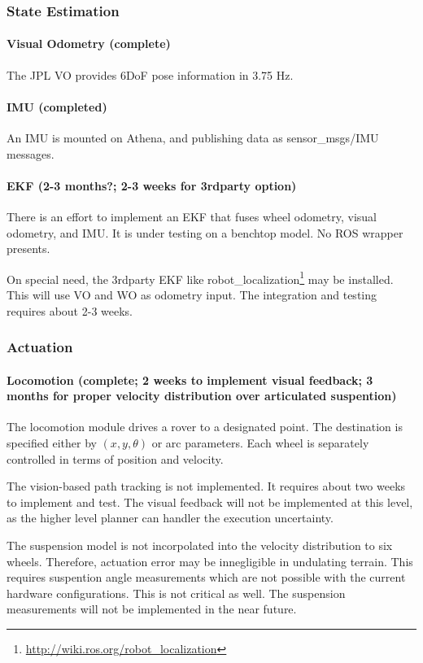 \documentclass[conference]{IEEEtran}
\newcommand{\kyon}[1]{{\color{cyan} #1}}
\newcommand{\done}[1]{{\color{gray} #1}}
\begin{document}
\subsubsection{State Estimation}

\paragraph{Visual Odometry (complete)}
\done{
The JPL VO provides 6DoF pose information in 3.75 Hz. 
}

\paragraph{IMU (completed)}
\done{
An IMU is mounted on Athena, and publishing data as sensor\_msgs/IMU messages.
}

\paragraph{EKF (2-3 months?; 2-3 weeks for 3rdparty option)}
There is an effort to implement an EKF that fuses wheel odometry, visual odometry, and IMU. It is under testing on a benchtop model. No ROS wrapper presents.

On special need,  the 3rdparty EKF like robot\_localization\footnote{\url{http://wiki.ros.org/robot_localization}} may be installed. This will use VO and WO as odometry input. The integration and testing requires about 2-3 weeks.


\subsubsection{Actuation}

\paragraph{Locomotion (complete; 2 weeks to implement visual feedback; 3 months for proper velocity distribution over articulated suspention)}
\done{
The locomotion module drives a rover to a designated point. The destination is specified either by $ (x, y, \theta) $ or arc parameters. Each wheel is separately controlled in terms of position and velocity.

The vision-based path tracking is not implemented. It requires about two weeks to implement and test. 
\kyon{The visual feedback will not be implemented at this level, as the higher level planner can handler the execution uncertainty.}

The suspension model is not incorpolated into the velocity distribution to six wheels. Therefore, actuation error may be innegligible in undulating terrain. This requires suspention angle measurements which are not possible with the current hardware configurations. 
\kyon{This is not critical as well. The suspension measurements will not be implemented in the near future.}
}
\end{document}
